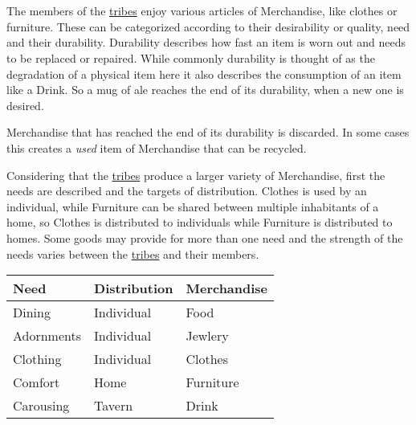 \section{}\label{ch:Goods:Merchandise}

The members of the \hyperref[ch:Tribes]{tribes} enjoy various articles of
\gls*{Merchandise}, like clothes or furniture. These can be categorized
according to their desirability or quality, need and their durability.
Durability describes how fast an item is worn out and needs to be replaced or
repaired. While commonly durability is thought of as the degradation of a
physical item here it also describes the consumption of an item like a
\gls{Drink}. So a mug of ale reaches the end of its durability, when a new one
is desired.

\Gls{Merchandise} that has reached the end of its durability is discarded.
In some cases this creates a \emph{used} item of \gls{Merchandise} that can be recycled.

Considering that the \hyperref[ch:Tribes]{tribes} produce a larger variety of
\gls*{Merchandise}, first the needs are described and the targets of
distribution. \Gls{Clothes} is used by an individual, while \gls{Furniture} can
be shared between multiple inhabitants of a home, so \Gls{Clothes} is
distributed to individuals while \gls{Furniture} is distributed to homes. Some
goods may provide for more than one need and the strength of the needs varies
between the \hyperref[ch:Tribes]{tribes} and their members.

\begin{longtable}{lll}
	\toprule
	Need             & Distribution & \Gls{Merchandise} \\
	\midrule
	\Gls{Dining}     & Individual   & \Gls{Food}        \\
	\Gls{Adornments} & Individual   & \Gls{Jewlery}     \\
	\Gls{Clothing}   & Individual   & \Gls{Clothes}     \\
	\Gls{Comfort}    & Home         & \Gls{Furniture}   \\
	\Gls{Carousing}  & Tavern       & \Gls{Drink}       \\
	\bottomrule
\end{longtable}

\subsection{}\label{ch:Goods:Merchandise:Jewlery}

